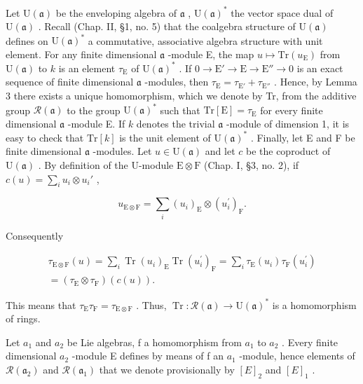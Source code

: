 Let \(\mathrm{U}(\mathfrak{a})\) be the enveloping algebra of \(\mathfrak{a}\) , \(\mathrm{U}(\mathfrak{a})^*\) the vector space dual of \(\mathrm{U}(\mathfrak{a})\) . Recall (Chap. II, §1, no. 5) that the coalgebra structure of \(\mathrm{U}(\mathfrak{a})\) defines on \(\mathrm{U}(\mathfrak{a})^*\) a commutative, associative algebra structure with unit element. For any finite dimensional \(\mathfrak{a}\) -module E, the map \(u \mapsto \mathrm{Tr}(u_{\mathrm{E}})\) from \(\mathrm{U}(\mathfrak{a})\) to \(k\) is an element \(\tau_{\mathrm{E}}\) of \(\mathrm{U}(\mathfrak{a})^*\) . If \(0 \longrightarrow \mathrm{E}' \longrightarrow \mathrm{E} \longrightarrow \mathrm{E}'' \longrightarrow 0\) is an exact sequence of finite dimensional \(\mathfrak{a}\) -modules, then \(\tau_{\mathrm{E}} = \tau_{\mathrm{E}'} + \tau_{\mathrm{E}''}\) . Hence, by Lemma 3 there exists a unique homomorphism, which we denote by Tr, from the additive group \(\mathcal{R}(\mathfrak{a})\) to the group \(\mathrm{U}(\mathfrak{a})^*\) such that \(\mathrm{Tr}[\mathrm{E}] = \tau_{\mathrm{E}}\) for every finite dimensional \(\mathfrak{a}\) -module E. If \(k\) denotes the trivial \(\mathfrak{a}\) -module of dimension 1, it is easy to check that \(\mathrm{Tr}[k]\) is the unit element of \(\mathrm{U}(\mathfrak{a})^*\) . Finally, let E and F be finite dimensional \(\mathfrak{a}\) -modules. Let \(u \in \mathrm{U}(\mathfrak{a})\) and let \(c\) be the coproduct of \(\mathrm{U}(\mathfrak{a})\) . By definition of the U-module \(\mathrm{E} \otimes \mathrm{F}\) (Chap. I, §3, no. 2), if \(c(u) = \sum_{i} u_i \otimes u_i'\) ,

\[
u _ {\mathrm{E} \otimes \mathrm{F}} = \sum_ {i} (u _ {i}) _ {\mathrm{E}} \otimes (u _ {i} ^ {\prime}) _ {\mathrm{F}}.
\]

Consequently

\[
\begin{array}{l} \tau_ {\mathrm{E} \otimes \mathrm{F}} (u) = \sum_ {i} \operatorname{Tr} (u _ {i}) _ {\mathrm{E}} \operatorname{Tr} (u _ {i} ^ {\prime}) _ {\mathrm{F}} = \sum_ {i} \tau_ {\mathrm{E}} (u _ {i}) \tau_ {\mathrm{F}} (u _ {i} ^ {\prime}) \\ = (\tau_ {\mathrm{E}} \otimes \tau_ {\mathrm{F}}) (c (u)). \end{array}
\]

This means that \(\tau_{\mathrm{E}}\tau_{\mathrm{F}} = \tau_{\mathrm{E}\otimes \mathrm{F}}\) . Thus, \(\operatorname {Tr}:\mathcal{R}(\mathfrak{a})\to \mathrm{U}(\mathfrak{a})^*\) is a homomorphism of rings.

Let \(a_{1}\) and \(a_{2}\) be Lie algebras, f a homomorphism from \(a_{1}\) to \(a_{2}\) . Every finite dimensional \(a_{2}\) -module E defines by means of f an \(a_{1}\) -module, hence elements of \(\mathcal{R}(\mathfrak{a}_{2})\) and \(\mathcal{R}(\mathfrak{a}_{1})\) that we denote provisionally by \([E]_{2}\) and \([E]_{1}\) .

